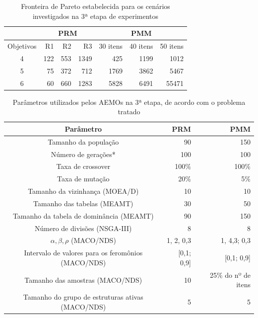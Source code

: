 \begin{table}[!htbp]
	\centering
	\caption{Fronteira de Pareto estabelecida para os cenários investigados na 3ª etapa de experimentos}
	\label{table_exp3_paretos}
	\begin{tabular}{c|rrr|rrr}
		& \multicolumn{3}{c|}{\textbf{PRM}} & \multicolumn{3}{c}{\textbf{PMM}} \\ \hline
		Objetivos & R1         & R2       & R3        & 30 itens  & 40 itens & 50 itens \\ \hline
		4         & 122        & 553       & 1349        & 425       & 1199      & 1012    \\
		5         & 75        & 372      & 712       & 1769      & 3862     & 5467   \\
		6         & 60       & 660      & 1283      & 5828      & 6491   & 55471   \\ \hline
	\end{tabular}
\end{table}

\begin{table}[!htbp]
	\caption{Parâmetros utilizados pelos AEMOs na 3ª etapa, de acordo com o problema tratado}
	\label{table_exp3_parametros}
	\begin{center}
		\begin{tabular}{c|r|r}
			\textbf{Parâmetro} & \textbf{PRM} &  \textbf{PMM} \\ %
			\hline
			Tamanho da população               &    90 &      150 \\ %
			Número de gerações*        &   100 &      100 \\ %
			Taxa de crossover                & 100\% &    100\% \\ %
			Taxa de mutação                 &  20\% &      5\% \\ %
			Tamanho da vizinhança (MOEA/D)    &    10 &       10 \\ %
			Tamanho das tabelas (MEAMT)   &    30 &       50 \\ %
			Tamanho da tabela de dominância (MEAMT) &    90 &      150 \\ %
			Número de divisões (NSGA-III)&     8 &        8 \\ %
			$\alpha, \beta, \rho$ (MACO/NDS)& 1, 2, 0,3 & 1, 4,3; 0,3 \\ %
			Intervalo de valores para os feromônios (MACO/NDS)& [0,1; 0,9] & [0,1; 0,9] \\ %
			Tamanho das amostras (MACO/NDS)& 10 &25\% do nº de itens \\  %
			Tamanho do grupo de estruturas ativas (MACO/NDS)& 5 & 5 \\
			\hline
		\end{tabular}
	\end{center}
\end{table}

